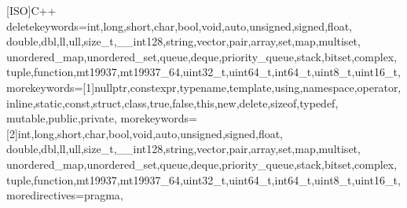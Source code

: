 [ISO]{C++}{
  deletekeywords={int,long,short,char,bool,void,auto,unsigned,signed,float,%
    double,dbl,ll,ull,size_t,__int128,string,vector,pair,array,set,map,multiset,%
    unordered_map,unordered_set,queue,deque,priority_queue,stack,bitset,complex,%
    tuple,function,mt19937,mt19937_64,uint32_t,uint64_t,int64_t,uint8_t,uint16_t},
  morekeywords=[1]{nullptr,constexpr,typename,template,using,namespace,operator,%
    inline,static,const,struct,class,true,false,this,new,delete,sizeof,typedef,%
    mutable,public,private},
  morekeywords=[2]{int,long,short,char,bool,void,auto,unsigned,signed,float,%
    double,dbl,ll,ull,size_t,__int128,string,vector,pair,array,set,map,multiset,%
    unordered_map,unordered_set,queue,deque,priority_queue,stack,bitset,complex,%
    tuple,function,mt19937,mt19937_64,uint32_t,uint64_t,int64_t,uint8_t,uint16_t},
  moredirectives={pragma},
}
